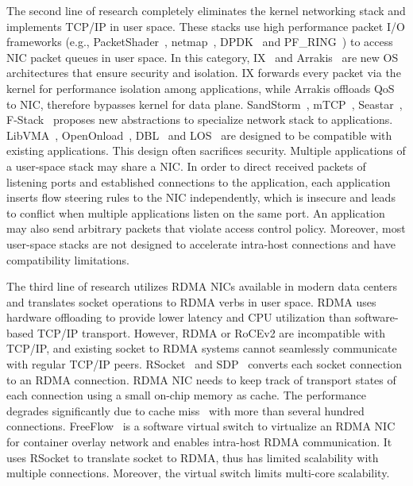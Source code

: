 The second line of research completely eliminates the kernel networking stack and implements TCP/IP in user space.
These stacks use high performance packet I/O frameworks (e.g., PacketShader~\cite{han2010packetshader}, netmap~\cite{rizzo2012netmap},  DPDK~\cite{dpdk} and PF\_RING~\cite{pf-ring}) to access NIC packet queues in user space.
In this category, IX~\cite{belay2017ix} and Arrakis~\cite{peter2016arrakis} are new OS architectures that ensure security and isolation.
IX forwards every packet via the kernel for performance isolation among applications, while Arrakis offloads QoS to NIC, therefore bypasses kernel for data plane.
SandStorm~\cite{marinos2014network}, mTCP~\cite{jeong2014mtcp}, Seastar~\cite{seastar}, F-Stack~\cite{fstack} proposes new abstractions to specialize network stack to applications.
LibVMA~\cite{libvma}, OpenOnload~\cite{openonload}, DBL~\cite{dbl} and LOS~\cite{huang2017high} are designed to be compatible with existing applications.
This design often sacrifices security. Multiple applications of a user-space stack may share a NIC.
In order to direct received packets of listening ports and established connections to the application, 
each application inserts flow steering rules to the NIC independently, which is insecure and leads to conflict when multiple applications listen on the same port.
An application may also send arbitrary packets that violate access control policy.
Moreover, most user-space stacks are not designed to accelerate intra-host connections and have compatibility limitations.

The third line of research utilizes RDMA NICs available in modern data centers~\cite{guo2016rdma} and translates socket operations to RDMA verbs in user space.
RDMA uses hardware offloading to provide lower latency and CPU utilization than software-based TCP/IP transport.
However, RDMA or RoCEv2 are incompatible with TCP/IP, and existing socket to RDMA systems cannot seamlessly communicate with regular TCP/IP peers.
RSocket~\cite{rsockets} and SDP~\cite{socketsdirect} converts each socket connection to an RDMA connection.
RDMA NIC needs to keep track of transport states of each connection using a small on-chip memory as cache.
The performance degrades significantly due to cache miss~\cite{mprdma,kaminsky2016design} with more than several hundred connections.
FreeFlow~\cite{freeflow} is a software virtual switch to virtualize an RDMA NIC for container overlay network and enables intra-host RDMA communication.
It uses RSocket to translate socket to RDMA, thus has limited scalability with multiple connections.
Moreover, the virtual switch limits multi-core scalability.

